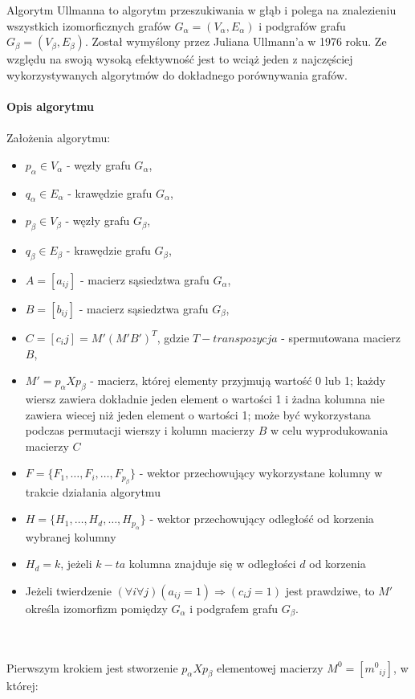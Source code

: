 \documentclass[a4paper,12pt]{article}
\begin{document}
Algorytm Ullmanna to algorytm przeszukiwania w głąb i polega na znalezieniu wszystkich izomorficznych grafów $G_\alpha = (V_\alpha, E_\alpha)$ i podgrafów grafu $G_\beta = (V_\beta, E_\beta)$. Został wymyślony przez Juliana Ullmann'a w 1976 roku\cite{ullmann1}. Ze względu na swoją wysoką efektywność jest to wciąż jeden z najczęściej wykorzystywanych algorytmów do dokładnego porównywania grafów.
\\ \\
\textbf{Opis algorytmu}
\\ \\
Założenia algorytmu\cite{ullmann}:
\begin{itemize}
\item $p_\alpha \in V_\alpha$ - węzły grafu $G_\alpha$,
\item $q_\alpha \in E_\alpha$ - krawędzie grafu $G_\alpha$,
\item $p_\beta \in V_\beta$ - węzły grafu $G_\beta$,
\item $q_\beta \in E_\beta$ - krawędzie grafu $G_\beta$,
\item $A = [a_{ij}]$ - macierz sąsiedztwa grafu $G_\alpha$,
\item $B = [b_{ij}]$ - macierz sąsiedztwa grafu $G_\beta$,
\item $C = [c_ij] = M'(M'B')^T$, gdzie $T - transpozycja$ - spermutowana macierz $B$,
\item $M' = p_\alpha X p_\beta$ - macierz, której elementy przyjmują wartość 0 lub 1; każdy wiersz zawiera dokładnie jeden element o wartości 1 i żadna kolumna nie zawiera wiecej niż jeden element o wartości 1; może być wykorzystana podczas permutacji wierszy i kolumn macierzy $B$ w celu wyprodukowania macierzy $C$
\item $F = \{ F_1, \ldots, F_i, \ldots, F_{p_\beta} \}$ - wektor przechowujący wykorzystane kolumny w trakcie działania algorytmu
\item $H = \{ H_1, \ldots, H_d, \ldots, H_{p_\alpha} \}$ - wektor przechowujący odległość od korzenia wybranej kolumny
\item $H_d = k$, jeżeli $k-ta$ kolumna znajduje się w odległości $d$ od korzenia
\item Jeżeli twierdzenie $(\forall{i} \forall{j}) (a_{ij} = 1) \Rightarrow (c_ij = 1)$ jest prawdziwe, to $M'$ określa izomorfizm pomiędzy $G_\alpha$ i podgrafem grafu $G_\beta$.
\end{itemize}
\\ \\
Pierwszym krokiem jest stworzenie $p_\alpha X p_\beta$ elementowej macierzy $M^0 = [{m^0}_{ij}]$, w której:
\end{document}
